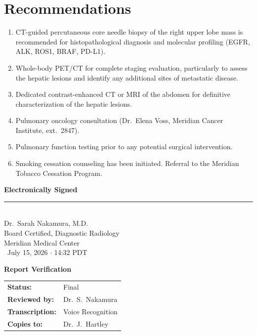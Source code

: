 \section{Recommendations}

\begin{enumerate}[leftmargin=*, itemsep=4pt, topsep=4pt]
  \item CT-guided percutaneous core needle biopsy of the right upper lobe mass is recommended for histopathological diagnosis and molecular profiling (EGFR, ALK, ROS1, BRAF, PD-L1).
  \item Whole-body PET/CT for complete staging evaluation, particularly to assess the hepatic lesions and identify any additional sites of metastatic disease.
  \item Dedicated contrast-enhanced CT or MRI of the abdomen for definitive characterization of the hepatic lesions.
  \item Pulmonary oncology consultation (Dr.\ Elena Voss, Meridian Cancer Institute, ext.\ 2847).
  \item Pulmonary function testing prior to any potential surgical intervention.
  \item Smoking cessation counseling has been initiated. Referral to the Meridian Tobacco Cessation Program.
\end{enumerate}

\vspace{14pt}

\begin{signaturebox}
  \begin{minipage}[t]{0.55\textwidth}
    \vspace{4pt}
    {\sffamily\bfseries\color{primaryblue} Electronically Signed} \\[6pt]
    \rule{3.2in}{0.4pt} \\
    {\small Dr.\ Sarah Nakamura, M.D.} \\
    {\small Board Certified, Diagnostic Radiology} \\
    {\small Meridian Medical Center} \\[4pt]
    {\footnotesize\color{primaryblue!70} \faCalendar\ July 15, 2026 \hspace{4pt}$\cdot$\hspace{4pt} 14:32 PDT}
  \end{minipage}
  \hfill
  \begin{minipage}[t]{0.4\textwidth}
    \vspace{4pt}
    {\sffamily\bfseries\color{primaryblue} Report Verification} \\[6pt]
    \begin{tabular}{@{}p{1.1in} p{1.5in}@{}}
      \textbf{Status:}       & Final \\
      \textbf{Reviewed by:}  & Dr.\ S.\ Nakamura \\
      \textbf{Transcription:}& Voice Recognition \\
      \textbf{Copies to:}    & Dr.\ J.\ Hartley \\
    \end{tabular}
  \end{minipage}
  \par
\end{signaturebox}

